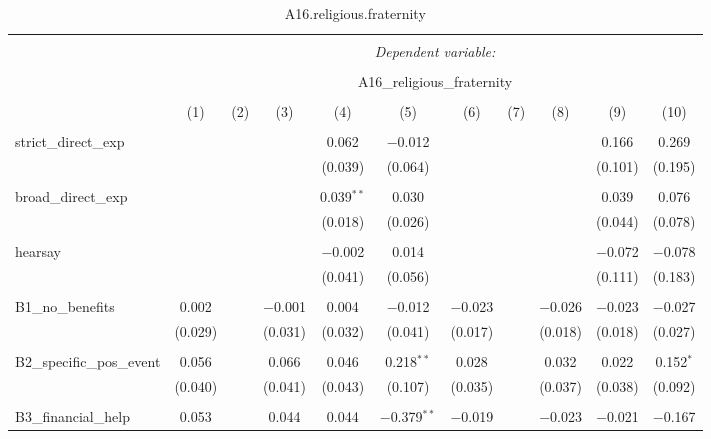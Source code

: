
\begin{table}[H] \centering 
  \caption{A16.religious.fraternity} 
  \label{} 
\tiny 
\begin{tabular}{@{\extracolsep{4pt}}lcccccccccc} 
\\[-1.8ex]\hline 
\hline \\[-1.8ex] 
 & \multicolumn{10}{c}{\textit{Dependent variable:}} \\ 
\cline{2-11} 
\\[-1.8ex] & \multicolumn{10}{c}{A16\_religious\_fraternity} \\ 
\\[-1.8ex] & (1) & (2) & (3) & (4) & (5) & (6) & (7) & (8) & (9) & (10)\\ 
\hline \\[-1.8ex] 
 strict\_direct\_exp &  &  &  & 0.062 & $-$0.012 &  &  &  & 0.166 & 0.269 \\ 
  &  &  &  & (0.039) & (0.064) &  &  &  & (0.101) & (0.195) \\ 
  & & & & & & & & & & \\ 
 broad\_direct\_exp &  &  &  & 0.039$^{**}$ & 0.030 &  &  &  & 0.039 & 0.076 \\ 
  &  &  &  & (0.018) & (0.026) &  &  &  & (0.044) & (0.078) \\ 
  & & & & & & & & & & \\ 
 hearsay &  &  &  & $-$0.002 & 0.014 &  &  &  & $-$0.072 & $-$0.078 \\ 
  &  &  &  & (0.041) & (0.056) &  &  &  & (0.111) & (0.183) \\ 
  & & & & & & & & & & \\ 
 B1\_no\_benefits & 0.002 &  & $-$0.001 & 0.004 & $-$0.012 & $-$0.023 &  & $-$0.026 & $-$0.023 & $-$0.027 \\ 
  & (0.029) &  & (0.031) & (0.032) & (0.041) & (0.017) &  & (0.018) & (0.018) & (0.027) \\ 
  & & & & & & & & & & \\ 
 B2\_specific\_pos\_event & 0.056 &  & 0.066 & 0.046 & 0.218$^{**}$ & 0.028 &  & 0.032 & 0.022 & 0.152$^{*}$ \\ 
  & (0.040) &  & (0.041) & (0.043) & (0.107) & (0.035) &  & (0.037) & (0.038) & (0.092) \\ 
  & & & & & & & & & & \\ 
 B3\_financial\_help & 0.053 &  & 0.044 & 0.044 & $-$0.379$^{**}$ & $-$0.019 &  & $-$0.023 & $-$0.021 & $-$0.167 \\ 

\end{tabular}
\end{table}
